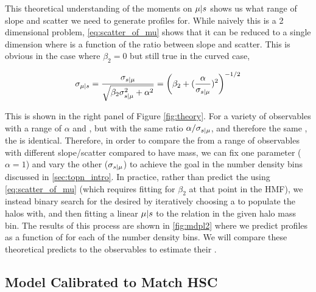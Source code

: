 \documentclass[a4paper,fleqn,usenatbib]{mnras}
\begin{document}
    This theoretical understanding of the moments on $\mu | s$ shows us what range of slope and
    scatter we need to generate \dsigma{} profiles for. While naively this is a 2 dimensional
    problem, \ref{eq:scatter_of_mu} shows that it can be reduced to a single dimension where
    \scatterMhaloObsSym{} is a function of the ratio between slope and scatter. This is obvious in
    the case where $\beta_2 = 0$ but still true in the curved case,

    \begin{equation}
        \sigma_{\mu{} | s{}}{} 
        	= \frac{\sigma_{s{} | \mu{}}}{\sqrt{\beta_2 \sigma_{s{} | \mu{}}^2 + \alpha^2}}
            = \left(\beta_2 + (\frac{\alpha}{\sigma_{s{} | \mu{}}})^2\right)^{-1/2}
        \label{eq:ratio_is_what_matters}
    \end{equation}
    
    This is shown in the right panel of Figure \ref{fig:theory}. For a variety of observables with a
    range of $\alpha$ and \scatterObsSymMhalo{}, but with the same ratio $\alpha /
    \sigma_{s{} | \mu{}}$, and therefore the same \scatterMhaloObsSym{}, the \dsigma{} is identical.
    Therefore, in order to compare the \dsigma{} from a range of observables with different slope/scatter
    compared to have mass, we can fix one parameter ($\alpha = 1$) and vary the other
    ($\sigma_{s{} | \mu{}}$) to achieve the goal \scatterMhaloObsSym{} in the number density bins
    discussed in \ref{sec:topn_intro}. In practice, rather than predict the \scatterMhaloObsSym{}
    using \ref{eq:scatter_of_mu} (which requires fitting for $\beta_2$ at that point in the HMF), we
    instead binary search for the desired \scatterMhaloObsSym{} by iteratively choosing a
    \scatterObsSymMhalo{} to populate the halos with, and then fitting a linear $\mu | s$ to
    the relation in the given halo mass bin. The results of this process are shown in \ref{fig:mdpl2}
    where we predict \dsigma{} profiles as a function of \scatterMhaloObsSym{} for each of the number
    density bins. We will compare these theoretical predicts to the observables to estimate their
    \scatterMhaloObsSym{}.

\subsection{Model Calibrated to Match HSC}
    \label{sec:halo_model}
\end{document}
